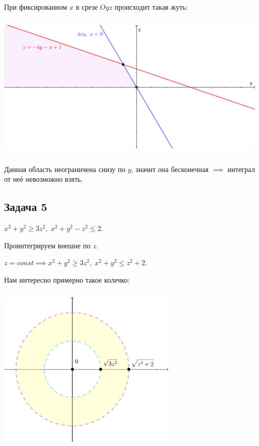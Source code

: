 \documentclass[a4paper, fleqn]{article}
\begin{document}
   При фиксированном $x$ в срезе $Oyz$ происходит такая жуть:
   
   \includegraphics[width=13cm, height=7cm]{list24imgs/task 2.4.5-2.png}
    
    Данная область неограничена снизу по $y$, значит она бесконечная $\implies$ интеграл от неё невозможно взять.
    
    
    \subsection*{Задача 5}
    
    $x^2 + y^2 \geq 3 z^2, \; x^2 + y^2 - z^2 \leq 2. $
    
    Проинтегрируем внешне по $z$. 
    
    $z = const \implies x^2 + y^2 \geq 3z^2, \; x^2 + y^2 \leq z^2 + 2.$
    
    Нам интересно примерно такое колечко:
    
    
   \includegraphics[width=8.5cm, height=8cm]{list24imgs/task 2.4.3.png}
    
\end{document}
